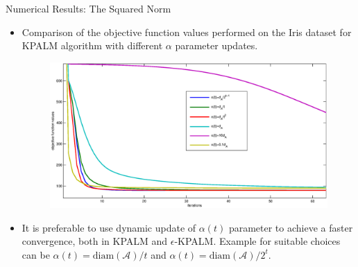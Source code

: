 \documentclass[9pt,handout]{beamer} %
\newcommand{\diam}{\mathrm{diam}} %
\begin{document}
	\begin{frame}{Numerical Results: The Squared Norm}
		\begin{itemize}[<+->]
            \item Comparison of the objective function values performed on the Iris dataset for KPALM algorithm with different $\alpha$ parameter updates.
		\begin{figure}
    		\centering
        	\includegraphics[width=0.8 \textwidth]{squared_norm_dyn_alpha_comp}
		\end{figure}
			\item It is preferable to use dynamic update of $\alpha(t)$ parameter to achieve a faster convergence, both in KPALM and $\epsilon$-KPALM. Example for suitable choices can be $\alpha(t)= \diam(\mathcal{A})/t$ and $\alpha(t)= \diam(\mathcal{A})/2^t$.
		\end{itemize}
	\end{frame}
	
\end{document}
